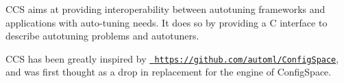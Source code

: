 CCS aims at providing interoperability between autotuning frameworks and applications with auto-\/tuning needs. It does so by providing a C interface to describe autotuning problems and autotuners.

CCS has been greatly inspired by \href{https://github.com/automl/ConfigSpace}{\texttt{ https\+://github.\+com/automl/\+Config\+Space}}, and was first thought as a drop in replacement for the engine of Config\+Space. 
